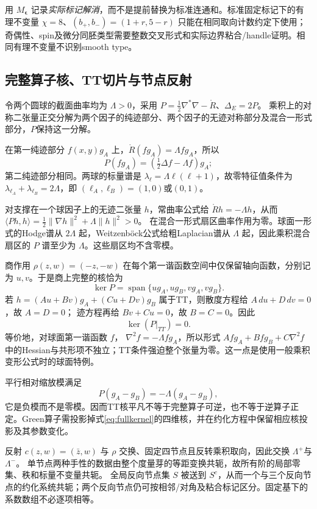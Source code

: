 \documentclass[UTF8,a4paper,11pt,fontset=fandol]{ctexart}
\numberwithin{equation}{section}
\theoremstyle{definition}
\begin{document}
用 $M_{\boldsymbol\epsilon}$ 记录\emph{实际标记解消}，而不是提前替换为标准连通和。标准固定标记下的有理不变量 $\chi=8$、$(b_+,b_-)=(1+r,5-r)$ 只能在相同取向计数约定下使用；奇偶性、spin及微分同胚类型需要整数交叉形式和实际边界粘合/handle证明。相同有理不变量不识别smooth type。

\subsection{完整算子核、TT切片与节点反射}\label{sec:fullkernel}
令两个圆球的截面曲率均为 $\Lambda>0$，采用
$P=\frac12\nabla^*\nabla-\mathring R$、$\Delta_E=2P$。
乘积上的对称二张量正交分解为两个因子的纯迹部分、两个因子的无迹对称部分及混合一形式部分，$P$保持这一分解。

在第一纯迹部分 $f(x,y)g_A$ 上，$\mathring R(fg_A)=\Lambda fg_A$，所以
\[
P(fg_A)=\left(\tfrac12\Delta f-\Lambda f\right)g_A;
\]
第二纯迹部分相同。两球的标量谱是
$\lambda_\ell=\Lambda\ell(\ell+1)$，故零特征值条件为
$\lambda_{\ell_A}+\lambda_{\ell_B}=2\Lambda$，即
$(\ell_A,\ell_B)=(1,0)$或$(0,1)$。

对支撑在一个球因子上的无迹二张量 $h$，常曲率公式给
$\mathring Rh=-\Lambda h$，从而
$\langle Ph,h\rangle=\frac12\|\nabla h\|^2+\Lambda\|h\|^2>0$。
在混合一形式扇区曲率作用为零。球面一形式的Hodge谱从 $2\Lambda$ 起，Weitzenböck公式给粗Laplacian谱从 $\Lambda$ 起，因此乘积混合扇区的 $P$ 谱至少为 $\Lambda$。这些扇区均不含零模。

商作用 $\rho(z,w)=(-z,-w)$ 在每个第一谐函数空间中仅保留轴向函数，分别记为 $u,v$。于是商上完整的核恰为
\begin{equation}\label{eq:fullkernel}
\ker P=\operatorname{span}\{ug_A,ug_B,vg_A,vg_B\}.
\end{equation}
若
$h=(Au+Bv)g_A+(Cu+Dv)g_B$
属于TT，则散度方程给 $A\,du+D\,dv=0$，故 $A=D=0$；
迹方程再给 $Bv+Cu=0$，故 $B=C=0$。因此
\begin{equation}\label{eq:ttkernel}
\ker(P|_{TT})=0.
\end{equation}
等价地，对球面第一谐函数 $f$，
$\nabla^2f=-\Lambda fg_A$，所以形式
$Afg_A+Bfg_B+C\nabla^2f$
中的Hessian与共形项不独立；TT条件强迫整个张量为零。这一点是使用一般乘积变形公式\cite{Kroncke}时的球面特例。

平行相对缩放模满足
\[
P(g_A-g_B)=-\Lambda(g_A-g_B),
\]
它是负模而不是零模。因而TT核平凡不等于完整算子可逆，也不等于逆算子正定。Green算子需投影掉式\eqref{eq:fullkernel}的四维核，并在约化方程中保留相应核投影及其参数变化。

反射 $c(z,w)=(\bar z,w)$ 与 $\rho$ 交换、固定四节点且反转乘积取向，因此交换 $\Lambda^+$与$\Lambda^-$。
单节点两种手性的数据由整个度量芽的等距变换共轭，故所有阶的局部零集、秩和标量不变量共轭。
全局反向节点集 $S$ 被送到 $S^c$，从而一个与三个反向节点的约化系统共轭；两个反向节点仍可按相邻/对角及粘合标记区分。固定基下的系数数组不必逐项相等。
\end{document}
